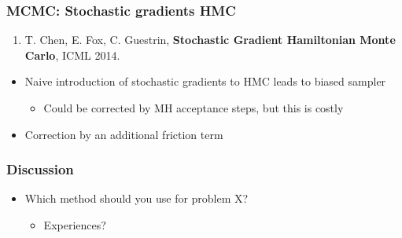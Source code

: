\documentclass{beamer}
\begin{document}
\begin{frame}
  \frametitle{MCMC: Stochastic gradients HMC}

  \begin{enumerate}
  \item T. Chen, E. Fox, C. Guestrin, \textbf{Stochastic Gradient Hamiltonian Monte Carlo}, ICML 2014.
  \end{enumerate}
  
  \begin{itemize}
  \item Naive introduction of stochastic gradients to HMC leads to
    biased sampler
    \begin{itemize}
    \item Could be corrected by MH acceptance steps, but this is costly
    \end{itemize}
  \item Correction by an additional friction term
  \end{itemize}
\end{frame}

\begin{frame}
  \frametitle{Discussion}

  \begin{itemize}
  \item Which method should you use for problem X?
    \begin{itemize}
    \item Experiences?
    \end{itemize}
  \end{itemize}
\end{frame}
\end{document}
